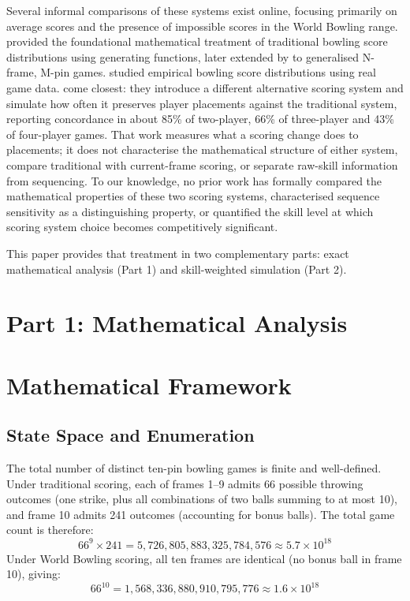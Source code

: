 \documentclass[USenglish]{article}
\theoremstyle{dgthm}
\theoremstyle{dgdef}
\begin{document}
Several informal comparisons of these systems exist online, focusing primarily on average scores and the presence of impossible scores in the World Bowling range. \citet{cooper1990} provided the foundational mathematical treatment of traditional bowling score distributions using generating functions, later extended by \citet{hohn2009} to generalised N-frame, M-pin games. \citet{keogh2011} studied empirical bowling score distributions using real game data. \citet{abdelsalam2017testing} come closest: they introduce a different alternative scoring system and simulate how often it preserves player placements against the traditional system, reporting concordance in about 85\% of two-player, 66\% of three-player and 43\% of four-player games. That work measures what a scoring change does to placements; it does not characterise the mathematical structure of either system, compare traditional with current-frame scoring, or separate raw-skill information from sequencing. To our knowledge, no prior work has formally compared the mathematical properties of these two scoring systems, characterised sequence sensitivity as a distinguishing property, or quantified the skill level at which scoring system choice becomes competitively significant.

This paper provides that treatment in two complementary parts: exact mathematical analysis (Part 1) and skill-weighted simulation (Part 2).


\section*{Part 1: Mathematical Analysis}

\section{Mathematical Framework}

\subsection{State Space and Enumeration}

The total number of distinct ten-pin bowling games is finite and well-defined. Under traditional scoring, each of frames 1--9 admits 66 possible throwing outcomes (one strike, plus all combinations of two balls summing to at most 10), and frame 10 admits 241 outcomes (accounting for bonus balls). The total game count is therefore:
%
\begin{equation*}
66^9 \times 241 = 5{,}726{,}805{,}883{,}325{,}784{,}576 \approx 5.7 \times 10^{18}
\end{equation*}
%
Under World Bowling scoring, all ten frames are identical (no bonus ball in frame 10), giving:
%
\begin{equation*}
66^{10} = 1{,}568{,}336{,}880{,}910{,}795{,}776 \approx 1.6 \times 10^{18}
\end{equation*}
\end{document}
